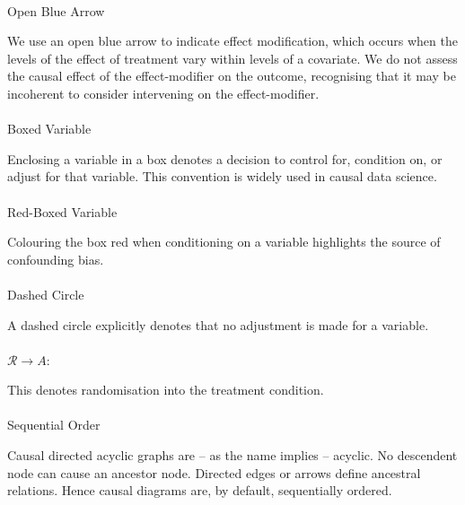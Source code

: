 \documentclass[
  single column]{article}
\makeatletter
\let\oldparagraph\paragraph
\renewcommand{\paragraph}{
    \@ifstar
      \xxxParagraphStar
      \xxxParagraphNoStar
  }
\newcommand{\xxxParagraphStar}[1]{\oldparagraph*{#1}\mbox{}}
\newcommand{\xxxParagraphNoStar}[1]{\oldparagraph{#1}\mbox{}}
\makeatother
\begin{document}
\paragraph{Open Blue Arrow}\label{open-blue-arrow}

We use an open blue arrow to indicate effect modification, which occurs
when the levels of the effect of treatment vary within levels of a
covariate. We do not assess the causal effect of the effect-modifier on
the outcome, recognising that it may be incoherent to consider
intervening on the effect-modifier.

\paragraph{Boxed Variable}\label{boxed-variable}

Enclosing a variable in a box denotes a decision to control for,
condition on, or adjust for that variable. This convention is widely
used in causal data science.

\paragraph{Red-Boxed Variable}\label{red-boxed-variable}

Colouring the box red when conditioning on a variable highlights the
source of confounding bias.

\paragraph{Dashed Circle}\label{dashed-circle}

A dashed circle explicitly denotes that no adjustment is made for a
variable.

\paragraph{\texorpdfstring{\(\mathcal{R} \rightarrow A\):}{\textbackslash mathcal\{R\} \textbackslash rightarrow A:}}\label{mathcalr-rightarrow-a}

This denotes randomisation into the treatment condition.

\paragraph{Sequential Order}\label{sequential-order}

Causal directed acyclic graphs are -- as the name implies -- acyclic. No
descendent node can cause an ancestor node. Directed edges or arrows
define ancestral relations. Hence causal diagrams are, by default,
sequentially ordered.
\end{document}

